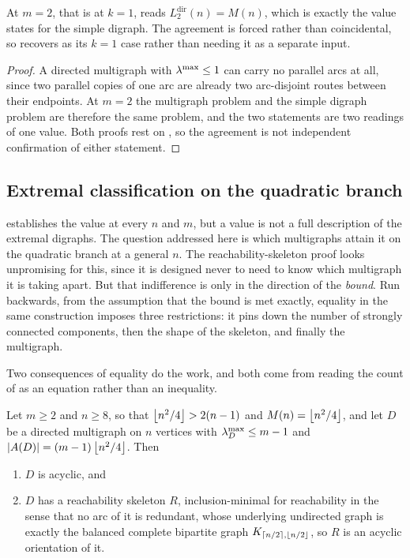 \begin{theorem}[The $m=2$ case collapses to the simple digraph]\label{thm:dir-multi-m2}
At $m=2$, that is at $k=1$,  reads $L_2^{\mathrm{dir}}(n) = M(n)$, which is exactly the value  states for the simple digraph. The agreement is forced rather than coincidental, so  recovers  as its $k=1$ case rather than needing it as a separate input.
\end{theorem}

\begin{proof}
A directed multigraph with $\lambda^{\max} \le 1$ can carry no parallel arcs at all, since two parallel copies of one arc are already two arc-disjoint routes between their endpoints. At $m=2$ the multigraph problem and the simple digraph problem are therefore the same problem, and the two statements are two readings of one value. Both proofs rest on , so the agreement is not independent confirmation of either statement.
\end{proof}

\subsection{Extremal classification on the quadratic branch}\label{sec:quadratic-uniqueness}

 establishes the value at every $n$ and $m$, but a value is not a full description of the extremal digraphs. The question addressed here is which multigraphs attain it on the quadratic branch at a general $n$. The reachability-skeleton proof looks unpromising for this, since it is designed never to need to know which multigraph it is taking apart. But that indifference is only in the direction of the \emph{bound}. Run backwards, from the assumption that the bound is met exactly, equality in the same construction imposes three restrictions: it pins down the number of strongly connected components, then the shape of the skeleton, and finally the multigraph.

Two consequences of equality do the work, and both come from reading the count of  as an equation rather than an inequality.

\begin{conjecture}\label{lem:equality-forces}
Let $m\ge2$ and $n \ge 8$, so that $\left\lfloor n^2/4 \right\rfloor > 2(n-1)$ and $M(n) = \left\lfloor n^2/4 \right\rfloor$, and let $D$ be a directed multigraph on $n$ vertices with $\lambda^{\max}_D \le m-1$ and $|A(D)| = (m-1)\left\lfloor n^2/4 \right\rfloor$. Then
\begin{enumerate}[label=(\arabic*)]
    \item $D$ is acyclic, and
    \item $D$ has a reachability skeleton $R$, inclusion-minimal for reachability in the sense that no arc of it is redundant, whose underlying undirected graph is exactly the balanced complete bipartite graph $K_{\left\lceil n/2 \right\rceil,\left\lfloor n/2 \right\rfloor}$, so $R$ is an acyclic orientation of it.
\end{enumerate}
\end{conjecture}

